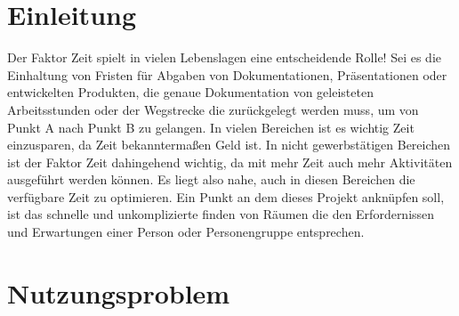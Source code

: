 \section{Einleitung}
\label{sec:Einleitung}

Der Faktor Zeit spielt in vielen Lebenslagen eine entscheidende Rolle! Sei es
die Einhaltung von Fristen für Abgaben von Dokumentationen, Präsentationen oder
entwickelten Produkten, die genaue Dokumentation von geleisteten Arbeitsstunden
oder der Wegstrecke die zurückgelegt werden muss, um von Punkt A nach Punkt B
zu gelangen. In vielen Bereichen ist es wichtig Zeit einzusparen, da Zeit
bekanntermaßen Geld ist. In nicht gewerbstätigen Bereichen ist der Faktor Zeit
dahingehend wichtig, da mit mehr Zeit auch mehr Aktivitäten ausgeführt werden
können. Es liegt also nahe, auch in diesen Bereichen die verfügbare Zeit zu
optimieren. Ein Punkt an dem dieses Projekt anknüpfen soll, ist das schnelle
und unkomplizierte finden von Räumen die den Erfordernissen und Erwartungen
einer Person oder Personengruppe entsprechen.


\section{Nutzungsproblem}
\label{sec:Nutzungsproblem}


